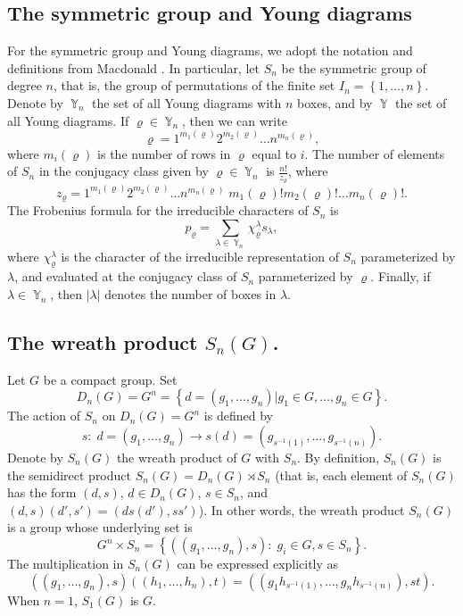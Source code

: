 \documentclass[12pt]{amsart}
\theoremstyle{definition}
\numberwithin{equation}{section}
\DeclareMathOperator{\Y}{\mathbb{Y}}
\begin{document}
\subsection{The symmetric group and Young diagrams}
For the symmetric group and Young diagrams, we adopt the notation and definitions from Macdonald \cite{Macdonald}.
In particular, let $S_n$ be the symmetric group of degree $n$, that is, the group of permutations of the finite set $I_n=\left\{1,\ldots,n\right\}$. Denote by $\Y_n$ the set of all Young diagrams with  $n$ boxes, and by $\Y$ the set of all Young diagrams. If $\varrho\in\Y_n$, then we can write
$$
\varrho=1^{m_1(\varrho)}2^{m_2(\varrho)}\ldots n^{m_n(\varrho)},
$$
where $m_i(\varrho)$ is the number of rows in $\varrho$ equal to $i$. The number of elements of $S_n$ in the conjugacy class given by $\varrho\in\Y_n$ is
$\frac{n!}{z_{\varrho}}$, where
$$
z_\varrho=1^{m_1(\varrho)}2^{m_2(\varrho)}\ldots n^{m_n(\varrho)}\; m_1(\varrho)! m_2(\varrho)!\ldots m_n(\varrho)!.
$$
The Frobenius formula for the irreducible characters of $S_n$ is
$$
p_{\varrho}=\sum\limits_{\lambda\in\Y_n}\chi^{\lambda}_{\varrho}s_{\lambda},
$$
where $\chi^{\lambda}_{\varrho}$ is the character of the irreducible representation of $S_n$ parameterized  by $\lambda$, and evaluated at the conjugacy class of $S_n$ parameterized by $\varrho$. Finally, if $\lambda\in\Y_n$, then $|\lambda|$ denotes the number of boxes in $\lambda$.
\subsection{The wreath product $S_n\left(G\right)$.}
Let $G$ be a compact group.  Set
\begin{equation}
D_n(G)=G^n=\left\{d=(g_1,\ldots,g_n)\vert g_1\in G,\ldots,g_n\in G\right\}.
\end{equation}
The action of $S_n$ on $D_n(G)=G^n$ is defined by
$$
s:\; d=\left(g_1,\ldots,g_n\right)\longrightarrow s(d)=\left(g_{s^{-1}(1)},\ldots,g_{s^{-1}(n)}\right).
$$
Denote by $S_n(G)$ the wreath product of $G$ with $S_n$. By definition, $S_n(G)$ is the semidirect product $S_n(G)=D_n(G)\rtimes S_n$ (that is, each element of $S_n(G)$ has the form
$(d,s)$, $d\in D_n(G)$, $s\in S_n$, and $(d,s)(d',s')=(ds(d'),ss')$).
In other words,  the wreath product $S_n\left(G\right)$
is a group whose underlying set is
$$
G^n\times S_n=\left\{\left(\left(g_1,\ldots,g_n\right),s\right):\; g_i\in G, s\in S_n\right\}.
$$
The multiplication in $S_n\left(G\right)$ can be expressed explicitly as
$$
\left(\left(g_1,\ldots,g_n\right),s\right)
\left(\left(h_1,\ldots,h_n\right),t\right)
=\left(\left(g_1h_{s^{-1}(1)},\ldots,g_nh_{s^{-1}(n)}\right),st\right).
$$
When $n=1$, $S_1\left(G\right)$ is $G$.
\end{document}

